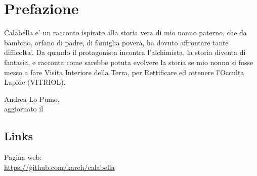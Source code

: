\chapter{Prefazione}

Calabella e' un racconto ispirato alla storia vera di mio nonno paterno, che da bambino, orfano di padre, di famiglia povera, ha dovuto affrontare tante difficolta'. Da quando il protagonista incontra l'alchimista, la storia diventa di fantasia, e racconta come sarebbe potuta evolvere la storia se mio nonno si fosse messo a fare Visita Interiore della Terra, per Rettificare ed ottenere l'Occulta Lapide (VITRIOL).\\

\begin{flushright}
    \vspace*{\fill}
    Andrea Lo Pumo, \finishDate\\
    aggiornato il \lastUpdateDate
\end{flushright}

\section{Links}

Pagina web:\\
\url{https://github.com/kareh/calabella}


